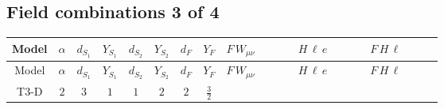 \documentclass[8pt]{article}
\begin{document}
\begin{landscape}
\subsection*{Field combinations 3 of 4}
\begin{longtable}{@{}cccccccc >{\raggedright\arraybackslash}p{0.21\linewidth} >{\raggedright\arraybackslash}p{0.21\linewidth} >{\raggedright\arraybackslash}p{0.21\linewidth}@{}}
\toprule
Model & $\alpha$ & $d_{S_1}$ & $Y_{S_1}$ & $d_{S_2}$ & $Y_{S_2}$ & $d_F$ & $Y_F$ & $F\,W_{\mu\nu}$ & $H\,\ell\,e$ & $F\,H\,\ell$ \\
\midrule
\endfirsthead
\toprule
Model & $\alpha$ & $d_{S_1}$ & $Y_{S_1}$ & $d_{S_2}$ & $Y_{S_2}$ & $d_F$ & $Y_F$ & $F\,W_{\mu\nu}$ & $H\,\ell\,e$ & $F\,H\,\ell$ \\
\midrule
\endhead
T3-D & $2$ & $3$ & $1$ & $1$ & $2$ & $2$ & $\frac{3}{2}$ & \scriptsize\adjustbox{max width=\linewidth}{$\begin{gathered} -\frac{1}{2} \hbar  \log \left(\frac{\bar{\mu}^{2}}{M_F^2}\right) \left(W_{\mu _1\mu _2}^{A_1}\right){}^2\end{gathered}$} & \scriptsize\adjustbox{max width=\linewidth}{$\begin{gathered} +\frac{\sqrt{3} \hbar  \overline{y_{1,i_3,r_1}} \overline{L_{a_1,i_2}}\, P_R\, e_{i_1} H_{a_1} y_{1,i_2,r_1} Y_{e,i_3,i_1}}{4 \epsilon } \\ -\frac{1}{8} \sqrt{3} \hbar  \overline{y_{1,i_3,r_1}} \overline{L_{a_1,i_2}}\, P_R\, e_{i_1} H_{a_1} y_{1,i_2,r_1} Y_{e,i_3,i_1} \\ +\frac{\hbar  \overline{y_{2,i_3,r_1}} \overline{L_{a_1,i_2}}\, P_R\, e_{i_1} H_{a_1} y_{2,i_2,r_1} Y_{e,i_3,i_1}}{4 \epsilon }\end{gathered}$} & \scriptsize\adjustbox{max width=\linewidth}{$\begin{gathered} +\frac{2 \hbar  \log \left(\frac{M_F^2}{m_2^2}\right) \overline{y_{1,i_1,r_1}} \overline{y_{2,i_2,r_1}} L_{a_4,i_2}{}^T\, C\, P_L\, L_{a_2,i_1} H_{a_1} H_{a_3} m_2^2 \lambda_5 \epsilon_{a_1,a_2} \epsilon_{a_3,a_4} M_F^3}{\sqrt{3} \left(M_F^2-m_1^2\right) \left(M_F^2-m_2^2\right) \left(m_1^2-m_2^2\right)} \\ -\frac{2 \hbar  \log \left(\frac{M_F^2}{m_1^2}\right) \overline{y_{1,i_1,r_1}} \overline{y_{2,i_2,r_1}} L_{a_4,i_2}{}^T\, C\, P_L\, L_{a_2,i_1} H_{a_1} H_{a_3} m_1^2 \lambda_5 \epsilon_{a_1,a_2} \epsilon_{a_3,a_4} M_F^3}{\sqrt{3} \left(M_F^2-m_1^2\right) \left(M_F^2-m_2^2\right) \left(m_1^2-m_2^2\right)} \\ +\frac{2 \hbar  \log \left(\frac{M_F^2}{m_2^2}\right) \overline{\lambda_5} \overline{L_{a_3,i_1}}\, C\, P_R\, \overline{L_{a_4,i_2}}{}^T m_2^2 y_{1,i_1,r_1} y_{2,i_2,r_1} \epsilon_{a_1,a_3} \epsilon_{a_2,a_4} H_{a_1}{}^{\dagger } H_{a_2}{}^{\dagger } M_F^3}{\sqrt{3} \left(M_F^2-m_1^2\right) \left(M_F^2-m_2^2\right) \left(m_1^2-m_2^2\right)}\end{gathered}$} \\

\end{longtable}
\end{landscape}
\end{document}
